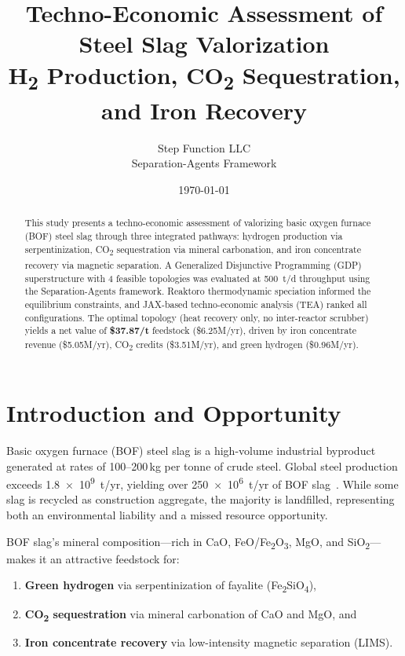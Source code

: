 \documentclass[11pt,a4paper]{article}
\title{Techno-Economic Assessment of\\[4pt] \textbf{Steel Slag} Valorization\\[6pt]
\large H\textsubscript{2} Production, CO\textsubscript{2} Sequestration, and Iron Recovery}
\author{Step Function LLC\\[2pt] \small Separation-Agents Framework}
\date{\today}
\begin{document}
\maketitle

\begin{abstract}
This study presents a techno-economic assessment of valorizing basic oxygen furnace (BOF)
steel slag through three integrated pathways: hydrogen production via serpentinization,
CO\textsubscript{2} sequestration via mineral carbonation, and iron concentrate recovery via
magnetic separation.  A Generalized Disjunctive Programming (GDP) superstructure with 4
feasible topologies was evaluated at \SI{500}{t/d} throughput using the Separation-Agents
framework.  Reaktoro thermodynamic speciation informed the equilibrium constraints, and
JAX-based techno-economic analysis (TEA) ranked all configurations.  The optimal topology
(heat recovery only, no inter-reactor scrubber) yields a net value of
\textbf{\$\num{37.87}/t} feedstock (\$\num{6.25}M/yr), driven by iron concentrate revenue
(\$\num{5.05}M/yr), CO\textsubscript{2} credits (\$\num{3.51}M/yr), and green hydrogen
(\$\num{0.96}M/yr).
\end{abstract}

\tableofcontents
\clearpage

\section{Introduction and Opportunity}

Basic oxygen furnace (BOF) steel slag is a high-volume industrial byproduct generated at
rates of 100--200\,kg per tonne of crude steel.  Global steel production exceeds
\SI{1.8e9}{t/yr}, yielding over \SI{250e6}{t/yr} of BOF slag~\cite{worldsteel2023}.
While some slag is recycled as construction aggregate, the majority is landfilled,
representing both an environmental liability and a missed resource opportunity.

BOF slag's mineral composition---rich in CaO, FeO/Fe\textsubscript{2}O\textsubscript{3},
MgO, and SiO\textsubscript{2}---makes it an attractive feedstock for:
\begin{enumerate}[nosep]
    \item \textbf{Green hydrogen} via serpentinization of fayalite
          (Fe\textsubscript{2}SiO\textsubscript{4}),
    \item \textbf{CO\textsubscript{2} sequestration} via mineral carbonation of CaO and MgO, and
    \item \textbf{Iron concentrate recovery} via low-intensity magnetic separation (LIMS).
\end{enumerate}
\end{document}
